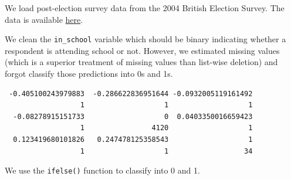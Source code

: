 \documentclass[]{article}
\newenvironment{Shaded}{\begin{snugshade}}{\end{snugshade}}
\newcommand{\CommentTok}[1]{\textcolor[rgb]{0.56,0.35,0.01}{\textit{#1}}}
\newcommand{\DataTypeTok}[1]{\textcolor[rgb]{0.13,0.29,0.53}{#1}}
\newcommand{\DecValTok}[1]{\textcolor[rgb]{0.00,0.00,0.81}{#1}}
\newcommand{\FloatTok}[1]{\textcolor[rgb]{0.00,0.00,0.81}{#1}}
\newcommand{\KeywordTok}[1]{\textcolor[rgb]{0.13,0.29,0.53}{\textbf{#1}}}
\newcommand{\NormalTok}[1]{#1}
\newcommand{\OperatorTok}[1]{\textcolor[rgb]{0.81,0.36,0.00}{\textbf{#1}}}
\newcommand{\OtherTok}[1]{\textcolor[rgb]{0.56,0.35,0.01}{#1}}
\newcommand{\StringTok}[1]{\textcolor[rgb]{0.31,0.60,0.02}{#1}}
\begin{document}
We load post-election survey data from the 2004 British Election Survey. The data is available \href{http://philippbroniecki.github.io/ML2017.io/data/bes.dta}{here}.

\begin{Shaded}
\end{Shaded}

We clean the \texttt{in\_school} variable which should be binary indicating whether a respondent is attending school or not. However, we estimated missing values (which is a superior treatment of missing values than list-wise deletion) and forgot classify those predictions into 0s and 1s.

\begin{Shaded}
\end{Shaded}

\begin{verbatim}
 -0.405100243979883  -0.286622836951644 -0.0932005119161492 
                  1                   1                   1 
  -0.08278915151733                   0  0.0403350016659423 
                  1                4120                   1 
  0.123419680101826   0.247478125358543                   1 
                  1                   1                  34 
\end{verbatim}

We use the \texttt{ifelse()} function to classify into 0 and 1.

\begin{Shaded}
\end{Shaded}
\end{document}
